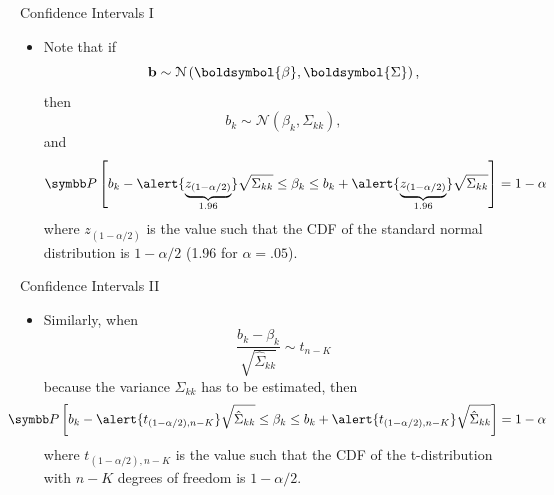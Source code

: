 \documentclass[aspectratio=169,11pt]{beamer}
\begin{document}



\begin{frame}{Confidence Intervals I}
\begin{itemize}
	\item Note that if 	\[
		{\bf b} \sim\mathcal{N}\left(\boldsymbol{\beta},\boldsymbol{\Sigma}\right),
	\]
	then \[
		b_{k} \sim\mathcal{N}\left(\beta_k,\Sigma_{kk}\right),	
	\]
	and \[
	\Pr\left[ b_{k} - \alert{\underbrace{z_{\left(1-\alpha/2\right)}}_{1.96}} \sqrt{\Sigma_{kk}} \le \beta_k \le b_k +  \alert{\underbrace{z_{\left(1-\alpha/2\right)}}_{1.96}}  \sqrt{\Sigma_{kk}}  \right] =1-\alpha 
	\]
	where $ z_{\left(1-\alpha/2\right)} $ is the value such that the CDF of the standard normal distribution is $1-\alpha/2$ (1.96 for $\alpha=.05$). 	

\end{itemize}
\end{frame}




\begin{frame}{Confidence Intervals II}
\begin{itemize}
	\item Similarly, when \[
		\frac{b_k - \beta_k}{\sqrt{\hat{\Sigma}_{kk}}} \sim t_{n-K}
	\]
	because the variance $\Sigma_{kk}$ has to be estimated, then
 \[
	\hspace*{-1cm} \Pr\left[ b_{k} - \alert{t_{\left(1-\alpha/2\right),n-K}} \sqrt{\hat{\Sigma}_{kk}} \le \beta_k
	 \le b_k +  \alert{t_{\left(1-\alpha/2\right),n-K}}  \sqrt{\hat{\Sigma}_{kk}}  \right] =1-\alpha 
	\]
	where $ t_{\left(1-\alpha/2\right),n-K} $ is the value such that the CDF of the t-distribution with $n-K$ degrees of freedom is $1-\alpha/2$. 	

\end{itemize}
\end{frame}
\end{document}
